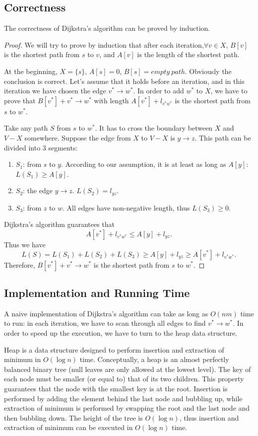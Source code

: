 \subsection{Correctness}
The correctness of Dijkstra's algorithm can be proved by induction.
\begin{proof}
We will try to prove by induction that after each iteration,$\forall v\in X$, $B[v]$ is the shortest path from $s$ to $v$, and $A[v]$ is the length of the shortest path. 

At the beginning, $X=\{s\}$, $A[s]=0$, $B[s]=empty\:path$. Obviously the conclusion is correct. Let's assume that it holds before an iteration, and in this iteration we have chosen the edge $v^*\rightarrow w^*$. In order to add $w^*$ to $X$, we have to prove that $B[v^*]+v^*\rightarrow w^*$ with length $A[v^*]+l_{v^*w^*}$ is the shortest path from $s$ to $w^*$.

Take any path $S$ from $s$ to $w^*$. It has to cross the boundary between $X$ and $V-X$ somewhere. Suppose the edge from $X$ to $V-X$ is $y\rightarrow z$. This path can be divided into 3 segments:
\begin{enumerate}
\item $S_1$: from $s$ to $y$. According to our assumption, it is at least as long as $A[y]$: $L(S_1)\geq A[y]$.
\item $S_2$: the edge $y\rightarrow z$. $L(S_2)=l_{yz}.$
\item $S_3$: from $z$ to $w$. All edges have non-negative length, thus $L(S_3)\geq 0.$
\end{enumerate}
Dijkstra's algorithm guarantees that 
$$A[v^*]+l_{v^*w^*}\leq A[y]+l_{yz}.$$
Thus we have 
$$L(S)=L(S_1)+L(S_2)+L(S_3)\geq A[y]+l_{yz}\geq A[v^*]+l_{v^*w^*}.$$
Therefore, $B[v^*]+v^*\rightarrow w^*$ is the shortest path from $s$ to $w^*$.
\end{proof}
\subsection{Implementation and Running Time}
A naive implementation of Dijkstra's algorithm can take as long as $O(nm)$ time to run: in each iteration, we have to scan through all edges to find $v^*\rightarrow w^*$. In order to speed up the execution, we have to turn to the heap data structure.

Heap is a data structure designed to perform insertion and extraction of minimum in $O(\log n)$ time. Conceptually, a heap is an almost perfectly balanced binary tree (null leaves are only allowed at the lowest level). The key of each node must be smaller (or equal to) that of its two children. This property guarantees that the node with the smallest key is at the root. Insertion is performed by adding the element behind the last node and bubbling up, while extraction of minimum is performed by swapping the root and the last node and then bubbling down. The height of the tree is $O(\log n)$, thus insertion and extraction of minimum can be executed in $O(\log n)$ time. 

